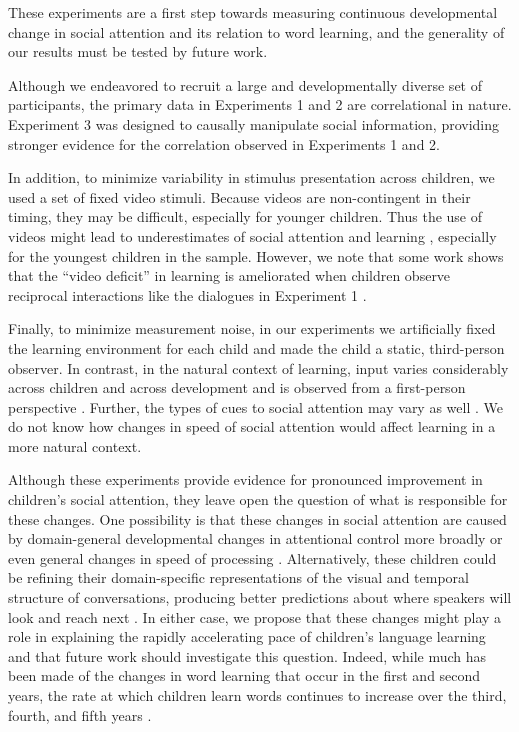 \documentclass[man,floatsintext]{apa6}
\begin{document}
These experiments are a first step towards measuring continuous developmental change in social attention and its relation to word learning, and the generality of our results must be tested by future work.

Although we endeavored to recruit a large and developmentally diverse set of participants, the primary data in Experiments 1 and 2 are correlational in nature. Experiment 3 was designed to causally manipulate social information, providing stronger evidence for the correlation observed in Experiments 1 and 2.

In addition, to minimize variability in stimulus presentation across children, we used a set of fixed video stimuli. Because videos are non-contingent in their timing, they may be difficult, especially for younger children. Thus the use of videos might lead to underestimates of social attention and learning \cite{anderson2005}, especially for the youngest children in the sample. However, we note that some work shows that the ``video deficit'' in learning is ameliorated when children observe reciprocal interactions like the dialogues in Experiment 1 \cite{odoherty2011}.

Finally, to minimize measurement noise, in our experiments we artificially fixed the learning environment for each child and made the child a static, third-person observer. In contrast, in the natural context of learning, input varies considerably across children and across development and is observed from a first-person perspective \cite{yu2013}. Further, the types of cues to social attention may vary as well \cite{franchak2018,kretch2014}. We do not know how changes in speed of social attention would affect learning in a more natural context.

Although these experiments provide evidence for pronounced improvement in children's social attention, they leave open the question of what is responsible for these changes. One possibility is that these changes in social attention are caused by domain-general developmental changes in attentional control more broadly \cite{rueda2005,smith2013} or even general changes in speed of processing \cite{kail1991}. Alternatively, these children could be refining their domain-specific representations of the visual and temporal structure of conversations, producing better predictions about where speakers will look and reach next \cite{acheson2009,krogh-jespersen2015}. In either case, we propose that these changes might play a role in explaining the rapidly accelerating pace of children's language learning and that future work should investigate this question. Indeed, while much has been made of the changes in word learning that occur in the first and second years, the rate at which children learn words continues to increase over the third, fourth, and fifth years \cite{bloom2000}.
\end{document}
